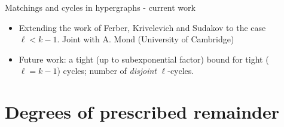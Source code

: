 \documentclass{beamer}
\theoremstyle{plain}
\begin{document}
	\begin{frame}{Matchings and cycles in hypergraphs - current work}
		\begin{itemize}

			\item Extending the work of Ferber, Krivelevich and Sudakov to the case $\ell < k-1$.
			Joint with A. Mond (University of Cambridge)

			\pause

			\item Future work: a tight (up to subexponential factor) bound for tight ($\ell = k-1$) cycles; number of \emph{disjoint} $\ell$-cycles.
		\end{itemize}
	\end{frame}





















\section{Degrees of prescribed remainder}
\end{document}
